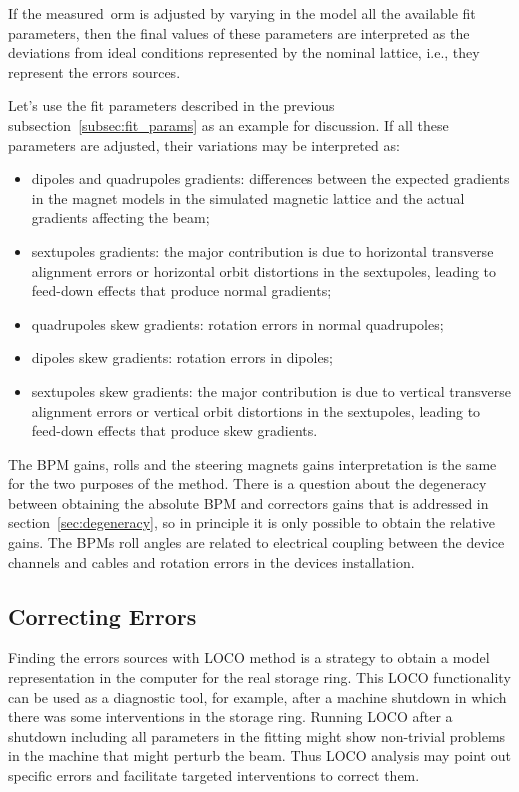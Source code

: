 If the measured~\gls{orm} is adjusted by varying in the model all the available fit parameters, then the final values of these parameters are interpreted as the deviations from ideal conditions represented by the nominal lattice, i.e., they represent the errors sources. 

Let's use the fit parameters described in the previous subsection~\ref{subsec:fit_params} as an example for discussion. If all these parameters are adjusted, their variations may be interpreted as:
\begin{itemize}
    \item dipoles and quadrupoles gradients: differences between the expected gradients in the magnet models in the simulated magnetic lattice and the actual gradients affecting the beam;
    \item sextupoles gradients: the major contribution is due to horizontal transverse alignment errors or horizontal orbit distortions in the sextupoles, leading to feed-down effects that produce normal gradients;
    \item quadrupoles skew gradients: rotation errors in normal quadrupoles;
    \item dipoles skew gradients: rotation errors in dipoles;
    \item sextupoles skew gradients: the major contribution is due to vertical transverse alignment errors or vertical orbit distortions in the sextupoles, leading to feed-down effects that produce skew gradients. 
    \end{itemize}
The BPM gains, rolls and the steering magnets gains interpretation is the same for the two purposes of the method. There is a question about the degeneracy between obtaining the absolute BPM and correctors gains that is addressed in section~\ref{sec:degeneracy}, so in principle it is only possible to obtain the relative gains. The BPMs roll angles are related to electrical coupling between the device channels and cables and rotation errors in the devices installation.
\subsection{Correcting Errors}
Finding the errors sources with LOCO method is a strategy to obtain a model representation in the computer for the real storage ring. This LOCO functionality can be used as a diagnostic tool, for example, after a machine shutdown in which there was some interventions in the storage ring. Running LOCO after a shutdown including all parameters in the fitting might show non-trivial problems in the machine that might perturb the beam. Thus LOCO analysis may point out specific errors and facilitate targeted interventions to correct them.

